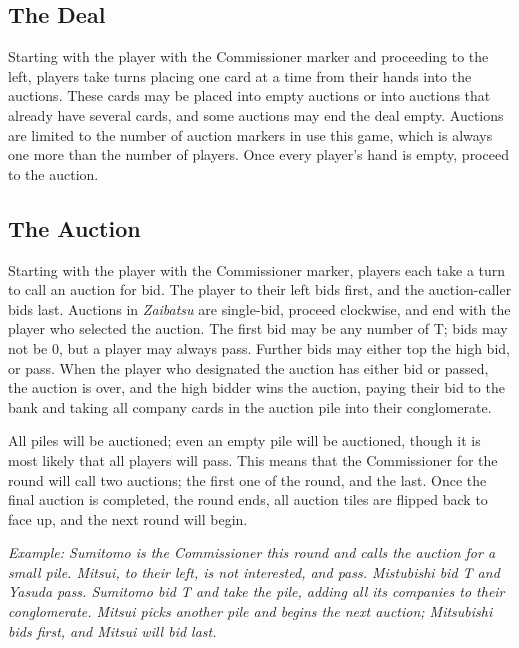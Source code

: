 \documentclass[]{article}
\newcommand{\tyen}{T\textyen}
\begin{document}
\subsection*{The Deal}

Starting with the player with the Commissioner marker and proceeding to the left, players take turns placing one card at a time from their hands into the auctions. These cards may be placed into empty auctions or into auctions that already have several cards, and some auctions may end the deal empty. Auctions are limited to the number of auction markers in use this game, which is always one more than the number of players. Once every player's hand is empty, proceed to the auction.

\subsection*{The Auction}

Starting with the player with the Commissioner marker, players each take a turn to call an auction for bid. The player to their left bids first, and the auction-caller bids last. Auctions in \emph{Zaibatsu} are single-bid, proceed clockwise, and end with the player who selected the auction. The first bid may be any number of \tyen ; bids may not be 0, but a player may always pass. Further bids may either top the high bid, or pass. When the player who designated the auction has either bid or passed, the auction is over, and the high bidder wins the auction, paying their bid to the bank and taking all company cards in the auction pile into their conglomerate.

All piles will be auctioned; even an empty pile will be auctioned, though it is most likely that all players will pass. This means that the Commissioner for the round will call two auctions; the first one of the round, and the last. Once the final auction is completed, the round ends, all auction tiles are flipped back to face up, %
and the next round will begin. %

\indent\textit{Example: Sumitomo is the Commissioner this round and calls the auction for a small pile. Mitsui, to their left, is not interested, and pass. Mistubishi bid \tyen 4 and Yasuda pass. Sumitomo bid \tyen 5 and take the pile, adding all its companies to their conglomerate. Mitsui picks another pile and begins the next auction; Mitsubishi bids first, and Mitsui will bid last.}
\end{document}

